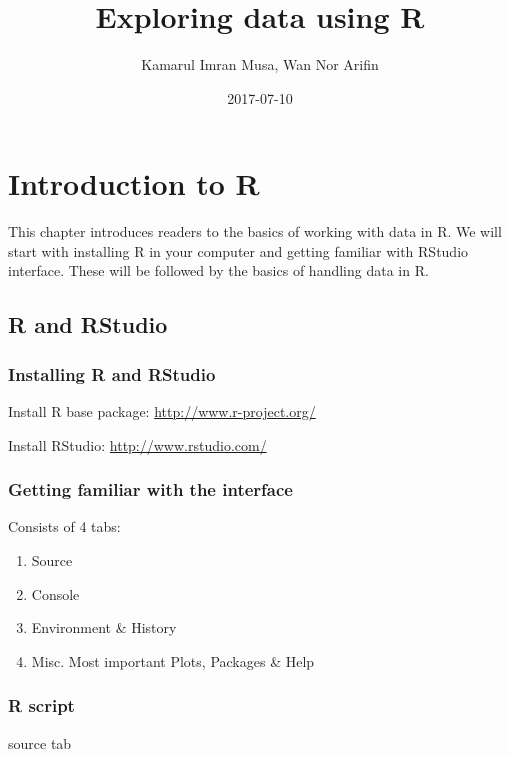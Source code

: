 \documentclass[]{book}
\title{Exploring data using R}
\author{Kamarul Imran Musa, Wan Nor Arifin}
\date{2017-07-10}
\providecommand{\tightlist}{%
  \setlength{\itemsep}{0pt}\setlength{\parskip}{0pt}}
\theoremstyle{definition}
\theoremstyle{definition}
\theoremstyle{remark}
\begin{document}
\maketitle

{
\setcounter{tocdepth}{1}
\tableofcontents
}
\chapter{Introduction to R}\label{introduction-to-r}

This chapter introduces readers to the basics of working with data in R.
We will start with installing R in your computer and getting familiar
with RStudio interface. These will be followed by the basics of handling
data in R.

\section{R and RStudio}\label{r-and-rstudio}

\subsection{Installing R and RStudio}\label{installing-r-and-rstudio}

Install R base package: \url{http://www.r-project.org/}

Install RStudio: \url{http://www.rstudio.com/}

\subsection{Getting familiar with the
interface}\label{getting-familiar-with-the-interface}

Consists of 4 tabs:

\begin{enumerate}
\def\labelenumi{\arabic{enumi}.}
\tightlist
\item
  Source
\item
  Console
\item
  Environment \& History
\item
  Misc. Most important Plots, Packages \& Help 
\end{enumerate}

\subsection{R script}\label{r-script}

source tab
\end{document}
